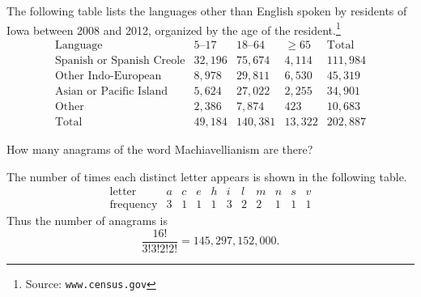 \documentclass[addpoints,12pt]{exam}
\begin{document}
\begin{questions}
\question The following table lists
the languages other than English spoken by residents
of Iowa between 2008 and 2012, organized by the age
of the resident.\footnote{Source: {\tt www.census.gov}}
\[\begin{array}{r|rrr|r}
\text{Language}&\text{$5$--$17$}
&\text{$18$--$64$}&\ge 65&\text{Total}\\\hline
\text{Spanish or Spanish Creole}&32,196&75,674&4,114&111,984\\
\text{Other Indo-European}&8,978&29,811&6,530&45,319\\
\text{Asian or Pacific Island}&5,624&27,022&2,255&34,901\\
\text{Other}&2,386&7,874&423&10,683\\\hline
\text{Total}&49,184&140,381&13,322&202,887
\end{array}\]
\newpage

\question How many anagrams of the word
{\textsf{Machiavellianism}} are there?
\begin{solution}
The number of times each distinct letter appears is
shown in the following table.
\[\begin{array}{r|cccccccccc}
\text{letter}&a&c&e&h&i&l&m&n&s&v\\\hline
\text{frequency}&3&1&1&1&3&2&2&1&1&1
\end{array}\]
Thus the number of anagrams is
\[\frac{16!}{3!3!2!2!}=145,297,152,000.\]
\end{solution}
\vspace{3in}


\end{questions}
\end{document}
